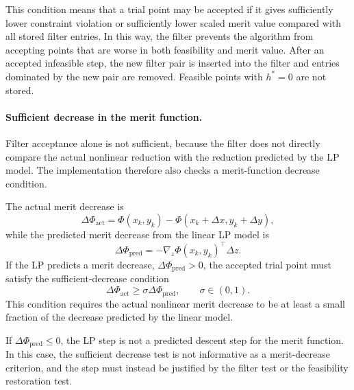 \documentclass[11pt,a4paper]{article}
\begin{document}
This condition means that a trial point may be accepted if it gives
sufficiently lower constraint violation or sufficiently lower scaled
merit value compared with all stored filter entries. In this way, the
filter prevents the algorithm from accepting points that are worse in
both feasibility and merit value. After an accepted infeasible step,
the new filter pair is inserted into the filter and entries dominated
by the new pair are removed. Feasible points with $h^*=0$ are not
stored.

\paragraph{Sufficient decrease in the merit function.}

Filter acceptance alone is not sufficient, because the filter does
not directly compare the actual nonlinear reduction with the
reduction predicted by the LP model. The implementation therefore
also checks a merit-function decrease condition.

The actual merit decrease is
\begin{equation}
\label{eq:appA_merit_actual}
    \Delta \Phi_{\mathrm{act}}
    =
    \Phi(x_k,y_k)
    -
    \Phi(x_k+\Delta x, y_k+\Delta y),
\end{equation}
while the predicted merit decrease from the linear LP model is
\begin{equation}
\label{eq:appA_merit_pred}
    \Delta \Phi_{\mathrm{pred}}
    =
    -
    \nabla_z\Phi(x_k,y_k)^{\!\top}\Delta z .
\end{equation}
If the LP predicts a merit decrease,
$\Delta\Phi_{\mathrm{pred}}>0$, the accepted trial point must satisfy
the sufficient-decrease condition
\begin{equation}
\label{eq:appA_armijo}
    \Delta \Phi_{\mathrm{act}}
    \geq
    \sigma \Delta \Phi_{\mathrm{pred}},
    \qquad
    \sigma\in(0,1).
\end{equation}
This condition requires the actual nonlinear merit decrease to be at
least a small fraction of the decrease predicted by the linear model.

If $\Delta\Phi_{\mathrm{pred}}\leq 0$, the LP step is not a predicted
descent step for the merit function. In this case, the sufficient
decrease test is not informative as a merit-decrease criterion, and
the step must instead be justified by the filter test or the
feasibility restoration test.
\end{document}
